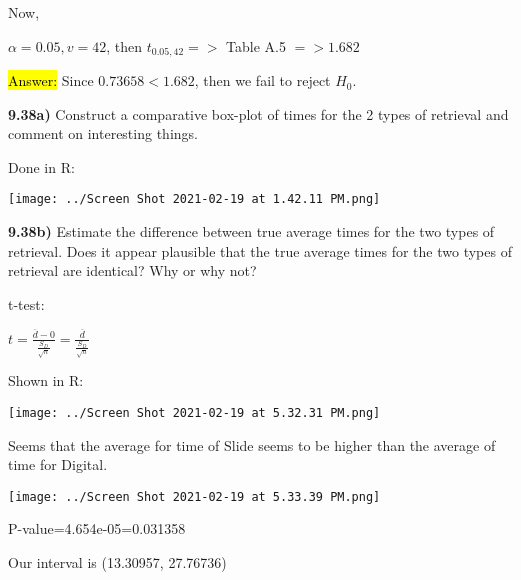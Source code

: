 \documentclass{article}
\begin{document}
 Now,
 
 $\alpha=0.05, v=42$, then $t_{0.05, 42} =>$ Table A.5 $=> 1.682$
 
\vspace{2mm}


\hl{Answer:}  Since  $0.73658 < 1.682$, then we fail to reject $H_{0}$.
 
 
 
\newpage
\textbf{9.38a)} Construct a comparative box-plot of times for the 2 types of retrieval and comment on interesting things.

\vspace{3mm}

Done in R:

\texttt{[image: ../Screen Shot 2021-02-19 at 1.42.11 PM.png]} 

\vspace{5mm}

\textbf{9.38b)} Estimate the difference between true average times for the two types of retrieval. Does it appear plausible that the true average times for the two types of retrieval are identical? Why or why not?

\vspace{3mm}
t-test: 

$t=\frac{\overline{d}-0}{\frac{S_{D}}{\sqrt{n}}}=\frac{\overline{d}}{\frac{S_{D}}{\sqrt{n}}}$

\vspace{3mm}

Shown in R: 

\vspace{2mm}

\texttt{[image: ../Screen Shot 2021-02-19 at 5.32.31 PM.png]}

\vspace{2mm}

Seems that the average for time of Slide seems to be higher than the average of time for Digital.

\vspace{3mm}

\texttt{[image: ../Screen Shot 2021-02-19 at 5.33.39 PM.png]}

P-value=4.654e-05=0.031358

\vspace{2mm}

Our interval is (13.30957, 27.76736)

\vspace{2mm}
\end{document}

